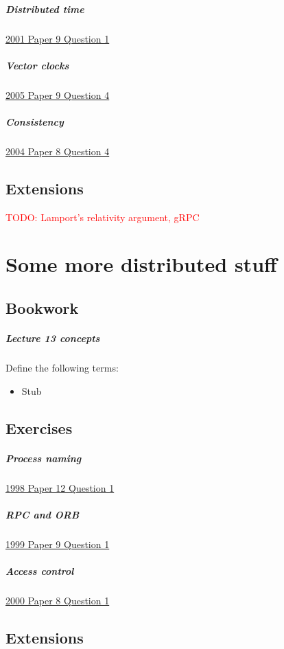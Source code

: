 \documentclass[12pt,a4paper,oneside,openright]{report}
\newcommand{\question}[2]{\paragraph{#1} #2}
\newcommand{\todo}[1]{\textcolor{red}{TODO: #1}}
\begin{document}
\question{Distributed
  time}{\href{https://www.cl.cam.ac.uk/teaching/exams/pastpapers/y2001p9q1.pdf}{2001
    Paper 9 Question 1}}

\question{Vector
  clocks}{\href{https://www.cl.cam.ac.uk/teaching/exams/pastpapers/y2005p9q4.pdf}{2005
    Paper 9 Question 4}}

\question{Consistency}{\href{https://www.cl.cam.ac.uk/teaching/exams/pastpapers/y2004p8q4.pdf}{2004
    Paper 8 Question 4}}

\section{Extensions}

\todo{Lamport's relativity argument, gRPC}

\chapter{Some more distributed stuff}

\section{Bookwork}

\question{Lecture 13 concepts}{Define the following terms:
  \begin{multicols}{2}
    \begin{itemize}
    \item Stub
    \end{itemize}
  \end{multicols}
}

\section{Exercises}

\question{Process
  naming}{\href{https://www.cl.cam.ac.uk/teaching/exams/pastpapers/y1998p12q1.pdf}{1998
    Paper 12 Question 1}}

\question{RPC and
  ORB}{\href{https://www.cl.cam.ac.uk/teaching/exams/pastpapers/y1999p9q1.pdf}{1999
    Paper 9 Question 1}}

\question{Access
  control}{\href{https://www.cl.cam.ac.uk/teaching/exams/pastpapers/y2000p8q1.pdf}{2000
    Paper 8 Question 1}}

\section{Extensions}




\end{document}
